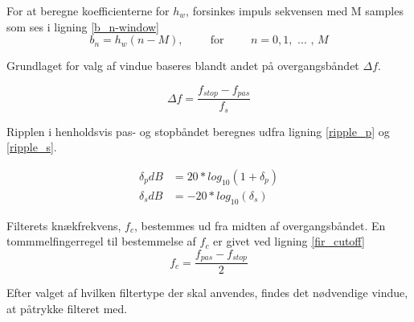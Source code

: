 For at beregne koefficienterne for $h_w$, forsinkes impuls sekvensen med M samples som ses i ligning \ref{b_n-window}
\begin{equation}
	b_n = h_w (n-M), \hspace{1cm} \text{for} \hspace{1cm} n = 0,1, \text{ ... , }M \label{b_n-window} 
\end{equation}

Grundlaget for valg af vindue baseres blandt andet på overgangsbåndet $\Delta f$.

\begin{equation}
\Delta f = \frac{f_{stop}-f_{pas}}{f_s} \label{Windows_transistionband}
\end{equation}

Ripplen i henholdsvis pas- og stopbåndet beregnes udfra ligning \ref{ripple_p} og \ref{ripple_s}.

\begin{align}
\delta_p dB &= 20*log_{10}(1+\delta_p) \label{ripple_p}\\
\delta_s dB &= -20*log_{10}(\delta_s) \label{ripple_s}
\end{align}

Filterets knækfrekvens, $f_c$, bestemmes ud fra midten af overgangsbåndet. En tommmelfingerregel til bestemmelse af $f_c$ er givet ved ligning \ref{fir_cutoff}
\begin{equation}
	f_c =\frac{f_{pas}-f_{stop}}{2} \label{fir_cutoff}
\end{equation}


Efter valget af hvilken filtertype der skal anvendes, findes det nødvendige vindue, at påtrykke filteret med.

